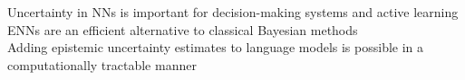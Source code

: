\documentclass[preview]{standalone}
\begin{document}
Uncertainty in NNs is important for decision-making systems and active learning\\ENNs are an efficient alternative to classical Bayesian methods\\Adding epistemic uncertainty estimates to language models is possible in a computationally tractable manner\\
\end{document}
